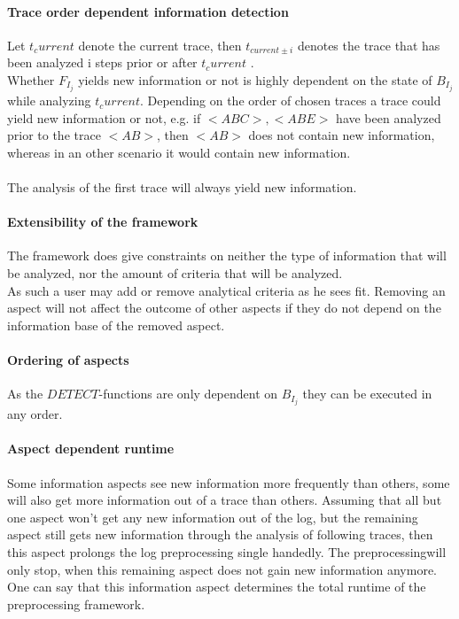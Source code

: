 \documentclass[
	a4paper,
	pagesize,
	pdftex,
	12pt,
	twoside, %
	BCOR=5mm, %
	ngerman,
	fleqn,
	final,
	]{scrartcl}
\begin{document}
\paragraph{Trace order dependent information detection}
Let $t_current$ denote the current trace, then $t_{current\pm i}$ denotes the trace that has been analyzed i steps prior or after $t_current$ .\\
Whether $F_{I_j}$ yields new information or not is highly dependent on the state of $B_{I_j}$ while analyzing $t_current$. Depending on the order of chosen traces a trace could yield new information or not, e.g. if $<ABC>,<ABE>$ have been analyzed prior to the trace $<AB>$, then $<AB>$ does not contain new information, whereas in an other scenario it would contain new information.\\\\The analysis of the first trace will always yield new information.
\paragraph{Extensibility of the framework}
The framework does give constraints on neither the type of information that will be analyzed, nor the amount of criteria that will be analyzed.\\ As such a user may add or remove analytical criteria as he sees fit. Removing an aspect will not affect the outcome of other aspects if they do not depend on the information base of the removed aspect.
\paragraph{Ordering of aspects}
As the $DETECT$-functions are only dependent on $B_{I_j}$ they can be executed in any order.
\paragraph{Aspect dependent runtime}
Some information aspects see new information more frequently than others, some will also get more information out of a trace than others. Assuming that all but one aspect won't get any new information out of the log, but the remaining aspect still gets new information through the analysis of following traces, then this aspect prolongs the log preprocessing single handedly. The preprocessingwill only stop, when this remaining aspect does not gain new information anymore. One can say that this information aspect determines the total runtime of the preprocessing framework.\\ 
\end{document}

